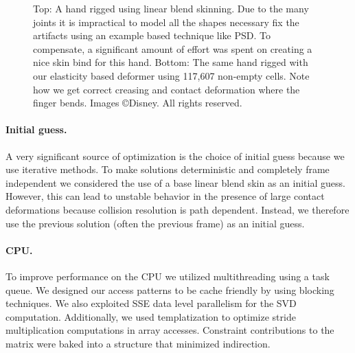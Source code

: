 \begin{figure}[tb]
\caption[A hand rigged using linear blend skinning and our method.]{Top: A hand rigged using linear blend skinning. Due to the many joints
it is impractical to model all the shapes necessary fix the artifacts using an
example based technique like PSD. To compensate, a significant amount of effort was
spent on creating a nice skin bind for this hand. Bottom: The same hand rigged with our
elasticity based deformer using 117,607 non-empty cells. Note how we get correct creasing and contact
deformation where the finger bends. Images \copyright Disney. All rights reserved.}
\label{fig:hand}
\end{figure}

\paragraph{Initial guess.} A very significant source of optimization is the choice of initial guess because
we use iterative methods.  To make solutions deterministic and completely frame
independent we considered the use of a base linear blend skin as an initial
guess. However, this can lead to unstable behavior in the presence of large
contact deformations because collision resolution is path dependent. Instead, we therefore use the previous
solution (often the previous frame) as an initial guess. 

\paragraph{CPU.} To improve performance on the CPU we utilized multithreading using a task
queue. We designed our access patterns to be cache friendly by using blocking
techniques.  We also exploited SSE data level parallelism for the SVD
computation. Additionally, we used templatization to optimize stride
multiplication computations in array accesses. Constraint contributions to the
matrix were baked into a structure that minimized indirection.

